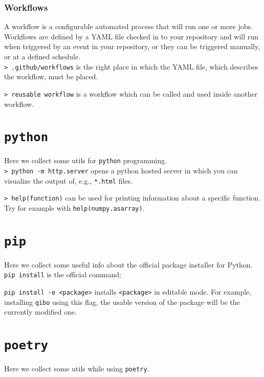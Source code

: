 \documentclass[11pt]{article}
\newcommand{\cmd}[1]{\colorbox{light-gray}{\textcolor{gio}{\texttt{#1}}}}
\begin{document}
\begin{multicols}{2}
\subsubsection{Workflows}

A workflow is a configurable automated process that will run one or more jobs. Workflows are defined by a YAML file checked in to your repository and will run when triggered by an event in your repository, or they can be triggered manually, or at a defined schedule. \\

\cmd{> .github/workflows} is the right place in which the YAML file, which describes the workflow, must be placed.

\cmd{> reusable workflow} is a workflow which can be called and used inside another workflow.

\section{\texttt{python}}

Here we collect some utils for \texttt{python} programming. \\

\cmd{> python -m http.server} opens a python hosted server in which you can visualize the output of, e.g., \texttt{*.html} files.

\cmd{> help(function)} can be used for printing information about a specific function.
Try for example with \texttt{help(numpy.asarray)}.

\section{\texttt{pip}}

Here we collect some useful info about the official  package installer for Python. \\

\cmd{pip install} is the official command;

\cmd{pip install -e <package>} installs \texttt{<package>} in editable mode. For example, installing \texttt{qibo} using this flag, the usable version of the package will be the currently modified one.

\section{\texttt{poetry}}

Here we collect some utils while using \texttt{poetry}. \\


\end{multicols}
\end{document}
